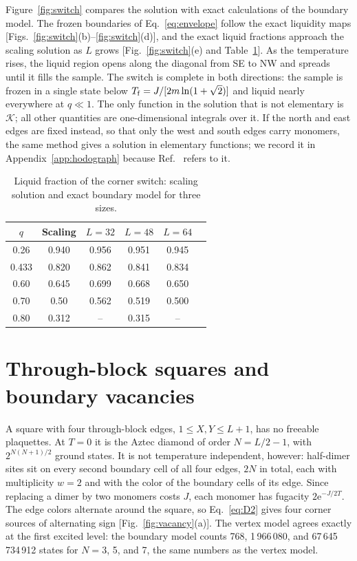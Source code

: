 \documentclass[reprint,aps,prb,floatfix,longbibliography,amsmath,amssymb]{revtex4-2}
\newcommand{\ee}{\mathrm{e}}
\newcommand{\cK}{\mathcal{K}}
\newcommand{\lnt}{\ln(1+\sqrt2)}
\begin{document}
Figure~\ref{fig:switch} compares the solution with exact calculations of the boundary model. The frozen boundaries of Eq.~\eqref{eq:envelope} follow the exact liquidity maps [Figs.~\ref{fig:switch}(b)--\ref{fig:switch}(d)], and the exact liquid fractions approach the scaling solution as $L$ grows [Fig.~\ref{fig:switch}(e) and Table~\ref{tab:switch}]. As the temperature rises, the liquid region opens along the diagonal from SE to NW and spreads until it fills the sample. The switch is complete in both directions: the sample is frozen in a single state below $T_{\rm f}=J/[2m\lnt]$ and liquid nearly everywhere at $q\ll1$. The only function in the solution that is not elementary is $\cK$; all other quantities are one-dimensional integrals over it. If the north and east edges are fixed instead, so that only the west and south edges carry monomers, the same method gives a solution in elementary functions; we record it in Appendix~\ref{app:hodograph} because Ref.~\cite{WonVacancies} refers to it.

\begin{table}[t]
\caption{\label{tab:switch}Liquid fraction of the corner switch: scaling solution and exact boundary model for three sizes.}
\begin{ruledtabular}
\begin{tabular}{cccccc}
$q$ & Scaling & $L=32$ & $L=48$ & $L=64$ \\
\hline
0.26 & 0.940 & 0.956 & 0.951 & 0.945 \\
0.433 & 0.820 & 0.862 & 0.841 & 0.834 \\
0.60 & 0.645 & 0.699 & 0.668 & 0.650 \\
0.70 & 0.50 & 0.562 & 0.519 & 0.500 \\
0.80 & 0.312 & -- & 0.315 & -- \\
\end{tabular}
\end{ruledtabular}
\end{table}

\section{Through-block squares and boundary vacancies}\label{sec:vacancy}

A square with four through-block edges, $1\le X,Y\le L+1$, has no freeable plaquettes. At $T=0$ it is the Aztec diamond of order $N=L/2-1$, with $2^{N(N+1)/2}$ ground states. It is not temperature independent, however: half-dimer sites sit on every second boundary cell of all four edges, $2N$ in total, each with multiplicity $w=2$ and with the color of the boundary cells of its edge. Since replacing a dimer by two monomers costs $J$, each monomer has fugacity $2\ee^{-J/2T}$. The edge colors alternate around the square, so Eq.~\eqref{eq:D2} gives four corner sources of alternating sign [Fig.~\ref{fig:vacancy}(a)]. The vertex model agrees exactly at the first excited level: the boundary model counts 768, 1\,966\,080, and 67\,645\,734\,912 states for $N=3$, 5, and 7, the same numbers as the vertex model.
\end{document}
